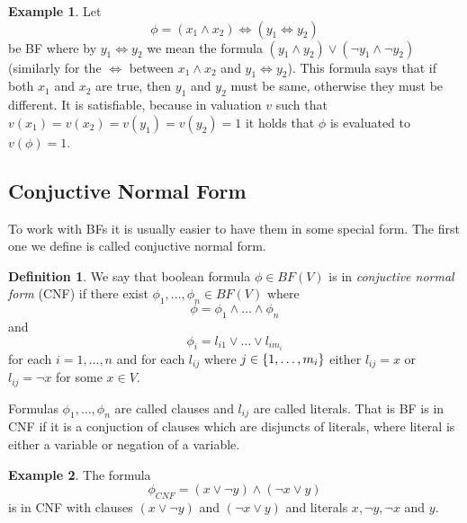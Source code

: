 \documentclass[
  digital, %
  twoside, %
  table,   %
  nolof,     %
  nolot,     %
]{fithesis3}
\let\setbuilder\set
\newcommand{\simpleset}[1]{\{{#1}\}}
\renewcommand{\set}[1]{\normalexpandarg\IfSubStr{#1}{|}{\setbuilder{#1}}{\simpleset{#1}}}
\theoremstyle{definition}
\newtheorem{definition}{Definition}
\newtheorem{example}{Example}
\theoremstyle{remark}
\newcommand{\BF}[1]{BF(#1)}
\newcommand{\lequal}{\Leftrightarrow}
\begin{document}
\begin{example}
\label{ex:BF:prenex}
Let
\[\phi = (x_1 \land x_2) \lequal (y_1 \lequal y_2)\]
be BF where by $y_1 \lequal y_2$ we mean the formula $(y_1 \land y_2) \lor (\neg y_1 \land \neg y_2)$ (similarly for the ${\lequal}$ between $x_1\land x_2$ and $y_1 \lequal y_2$). This formula says that if both $x_1$ and $x_2$ are true, then $y_1$ and $y_2$ must be same, otherwise they must be different. It is satisfiable, because in valuation $v$ such that $v(x_1) = v(x_2) = v(y_1) = v(y_2) = 1$ it holds that $\phi$ is evaluated to $v(\phi)=1$.
\end{example}

\subsection{Conjuctive Normal Form}
\label{sec:BF:CNF}
To work with BFs it is usually easier to have them in some special form. The first one we define is called conjuctive normal form.

\begin{definition}
We say that boolean formula $\phi \in \BF{V}$ is in \emph{conjuctive normal form} (CNF) if there exist $\phi_1,\dots,\phi_n \in \BF{V}$ where
\[\phi = \phi_1 \land \dots \land \phi_n\]
and
\[\phi_i = l_{i1} \lor \dots \lor l_{i{m_i}}\]
for each $i = 1, \dots, n$ and for each $l_{ij}$ where $j \in \set{1,\dots,m_i}$ either $l_{ij} = x$ or $l_{ij} = \neg x$ for some $x \in V$.
\end{definition}
Formulas $\phi_1,\dots,\phi_n$ are called clauses and $l_{ij}$ are called literals. That is BF is in CNF if it is a conjuction of clauses which are disjuncts of literals, where literal is either a variable or negation of a variable.

\begin{example}
The formula
\[\phi_{CNF} = (x \lor \neg y) \land (\neg x \lor y)\]
is in CNF with clauses $(x \lor \neg y)$ and $(\neg x \lor y)$ and literals $x,\neg y, \neg x$ and $y$.
\end{example}
\end{document}
